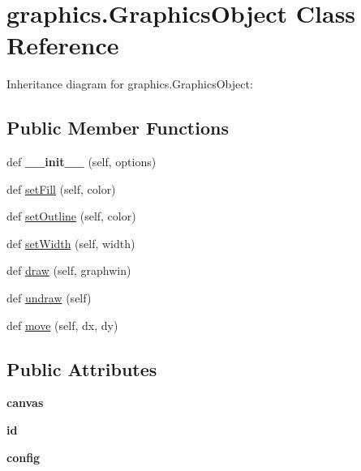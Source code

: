 \hypertarget{classgraphics_1_1GraphicsObject}{}\section{graphics.\+Graphics\+Object Class Reference}
\label{classgraphics_1_1GraphicsObject}


Inheritance diagram for graphics.\+Graphics\+Object\+:
\subsection*{Public Member Functions}
\begin{DoxyCompactItemize}
\item 
def {\bfseries \+\_\+\+\_\+init\+\_\+\+\_\+} (self, options)\hypertarget{classgraphics_1_1GraphicsObject_a87c93d91bf82269f0b31c1e669b7ddf4}{}\label{classgraphics_1_1GraphicsObject_a87c93d91bf82269f0b31c1e669b7ddf4}

\item 
def \hyperlink{classgraphics_1_1GraphicsObject_acfba33cbf63f5333f961b86e988fc292}{set\+Fill} (self, color)
\item 
def \hyperlink{classgraphics_1_1GraphicsObject_a0acf1399e539cc273170096552a04139}{set\+Outline} (self, color)
\item 
def \hyperlink{classgraphics_1_1GraphicsObject_a63006871dd6242bfc7aabe9ddcbb1263}{set\+Width} (self, width)
\item 
def \hyperlink{classgraphics_1_1GraphicsObject_ac7849154dccab74cb76d2a28035db48c}{draw} (self, graphwin)
\item 
def \hyperlink{classgraphics_1_1GraphicsObject_a7dc6432aa782c84f61407362e579aaf5}{undraw} (self)
\item 
def \hyperlink{classgraphics_1_1GraphicsObject_a2dc26fc41e5fa51c7a97b592da2926e8}{move} (self, dx, dy)
\end{DoxyCompactItemize}
\subsection*{Public Attributes}
\begin{DoxyCompactItemize}
\item 
{\bfseries canvas}\hypertarget{classgraphics_1_1GraphicsObject_a961312a5609642e6d96b892e9b5755e3}{}\label{classgraphics_1_1GraphicsObject_a961312a5609642e6d96b892e9b5755e3}

\item 
{\bfseries id}\hypertarget{classgraphics_1_1GraphicsObject_a465597cb2472214302bfa13c7708e217}{}\label{classgraphics_1_1GraphicsObject_a465597cb2472214302bfa13c7708e217}

\item 
{\bfseries config}\hypertarget{classgraphics_1_1GraphicsObject_a329ba44d4b0347a6f62eb4559110540a}{}\label{classgraphics_1_1GraphicsObject_a329ba44d4b0347a6f62eb4559110540a}

\end{DoxyCompactItemize}


